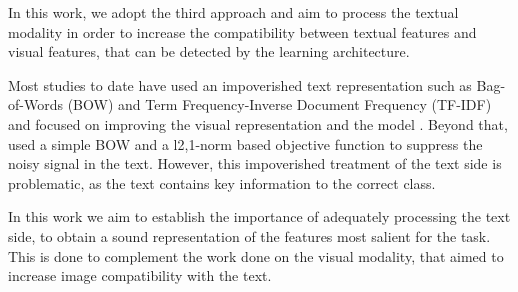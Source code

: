 \documentclass[11pt,a4paper]{article}
\begin{document}



In this work, we adopt the third approach and aim to process the textual modality in order to increase the compatibility between textual features and visual features, that can be detected by the learning architecture.
\par

Most studies to date have used an impoverished text representation such as Bag-of-Words (BOW) and Term Frequency-Inverse Document Frequency (TF-IDF) and focused on improving the visual representation and the model \cite{lei2015predicting,elhoseiny2013write,elhoseiny2016write,elhoseiny2017link,zhu2018generative}. Beyond that, \citet{qiao2016less} used a simple BOW and a l2,1-norm based objective function to suppress the noisy signal in the text. However, this impoverished treatment of the text side is problematic, as the text contains key information to the correct class. 

In this work we aim to establish the importance of adequately processing the text side, to obtain a sound representation of the features most salient for the task. This is done to complement the work done on the visual modality, that aimed to increase image compatibility with the text.

\end{document}
